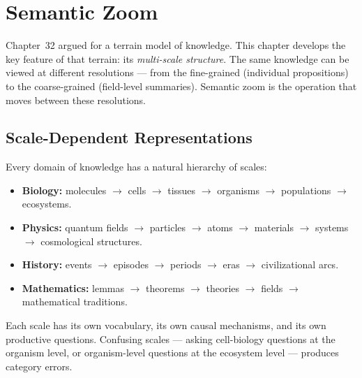 \chapter{Semantic Zoom}



Chapter~32 argued for a terrain model of knowledge. This chapter develops
the key feature of that terrain: its \emph{multi-scale structure}. The
same knowledge can be viewed at different resolutions — from the
fine-grained (individual propositions) to the coarse-grained (field-level
summaries). Semantic zoom is the operation that moves between these
resolutions.

\section{Scale-Dependent Representations}

Every domain of knowledge has a natural hierarchy of scales:

\begin{itemize}
  \item \textbf{Biology:} molecules $\to$ cells $\to$ tissues $\to$
        organisms $\to$ populations $\to$ ecosystems.
  \item \textbf{Physics:} quantum fields $\to$ particles $\to$ atoms
        $\to$ materials $\to$ systems $\to$ cosmological structures.
  \item \textbf{History:} events $\to$ episodes $\to$ periods $\to$
        eras $\to$ civilizational arcs.
  \item \textbf{Mathematics:} lemmas $\to$ theorems $\to$ theories
        $\to$ fields $\to$ mathematical traditions.
\end{itemize}

Each scale has its own vocabulary, its own causal mechanisms, and its
own productive questions. Confusing scales — asking cell-biology
questions at the organism level, or organism-level questions at the
ecosystem level — produces category errors.

